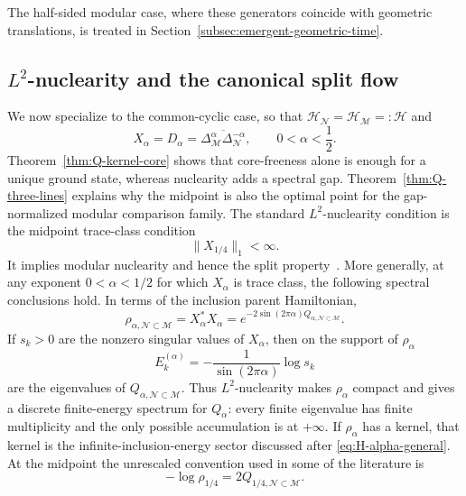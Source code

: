 \documentclass[a4paper,11pt]{article}
\theoremstyle{definition}
\newcommand{\mN}{\mathcal{N}}
\newcommand{\mH}{\mathcal{H}}
\newcommand{\mM}{\mathcal{M}}
\begin{document}
The half-sided modular case, where these generators coincide
with geometric translations, is treated in
Section~\ref{subsec:emergent-geometric-time}.

\subsection{$L^2$-nuclearity and the canonical split flow}
\label{sec:nuclearity}

We now specialize to the common-cyclic case, so that
$\mH_{\mN}=\mH_{\mM}=: \mathcal H$ and
\begin{equation}
    X_\alpha=D_\alpha
    =\overline{\Delta_{\mM}^\alpha\Delta_{\mN}^{-\alpha}},
    \qquad 0<\alpha<\frac12 .
\end{equation}
Theorem~\ref{thm:Q-kernel-core} shows that core-freeness alone
is enough for a unique ground state, whereas nuclearity adds a spectral
gap. Theorem~\ref{thm:Q-three-lines} explains why the midpoint is
also the optimal point for the gap-normalized modular comparison family.
The standard $L^2$-nuclearity condition is the midpoint trace-class condition
\begin{equation}
    \boxed{\|X_{1/4}\|_1<\infty .}
    \label{eq:L2-nuclearity-alpha}
\end{equation}
It implies modular nuclearity and hence the split property~\cite{BDL2007}. More generally, at any exponent $0<\alpha<1/2$ for which $X_\alpha$ is trace class, the following spectral conclusions hold. In terms of the inclusion parent Hamiltonian,
\begin{equation}
    \rho_{\alpha,\mN\subset\mM}
    =X_\alpha^*X_\alpha
    =e^{-2\sin(2\pi\alpha)Q_{\alpha,\mN\subset\mM}}.
    \label{eq:rho-inclusion-vs-split}
\end{equation}
If $s_k>0$ are the nonzero singular values of $X_\alpha$, then on the support
of $\rho_\alpha$
\begin{equation}
    E_k^{(\alpha)}
    =-\frac{1}{\sin(2\pi\alpha)}\log s_k
\end{equation}
are the eigenvalues of $Q_{\alpha,\mN\subset\mM}$. Thus $L^2$-nuclearity makes
$\rho_\alpha$ compact and gives a discrete finite-energy spectrum for
$Q_\alpha$: every finite eigenvalue has finite multiplicity and the only
possible accumulation is at $+\infty$. If $\rho_\alpha$ has a kernel, that
kernel is the infinite-inclusion-energy sector discussed after
\eqref{eq:H-alpha-general}. At the midpoint the unrescaled convention used in
some of the literature is
\begin{equation}
    -\log\rho_{1/4}=2Q_{1/4,\mN\subset\mM}.
\end{equation}
\end{document}
